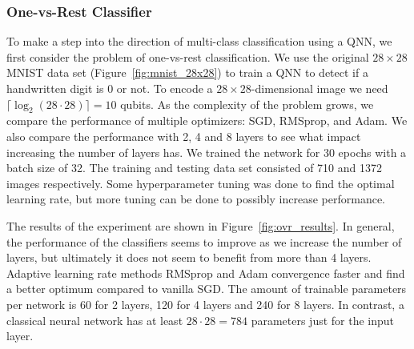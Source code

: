 \documentclass[a4paper,10pt]{article}
\begin{document}
\subsubsection{One-vs-Rest Classifier}
To make a step into the direction of multi-class classification using a QNN, we first consider the problem of one-vs-rest classification.
We use the original $28 \times 28$ MNIST data set (Figure~\ref{fig:mnist_28x28}) to train a QNN to detect if a handwritten digit is 0 or not.
To encode a $28 \times 28$-dimensional image we need $\lceil \log_2(28 \cdot 28) \rceil = 10$ qubits.
As the complexity of the problem grows, we compare the performance of multiple optimizers: SGD, RMSprop, and Adam.
We also compare the performance with 2, 4 and 8 layers to see what impact increasing the number of layers has.
We trained the network for 30 epochs with a batch size of 32.
The training and testing data set consisted of 710 and 1372 images respectively.
Some hyperparameter tuning was done to find the optimal learning rate, but more tuning can be done to possibly increase performance.

The results of the experiment are shown in Figure~\ref{fig:ovr_results}.
In general, the performance of the classifiers seems to improve as we increase the number of layers, but ultimately it does not seem to benefit from more than 4 layers.
Adaptive learning rate methods RMSprop and Adam convergence faster and find a better optimum compared to vanilla SGD.
The amount of trainable parameters per network is 60 for 2 layers, 120 for 4 layers and 240 for 8 layers.
In contrast, a classical neural network has at least $28 \cdot 28 = 784$ parameters just for the input layer.
\end{document}
